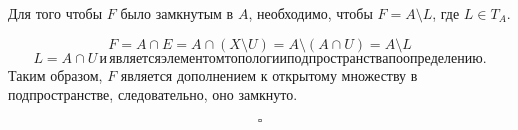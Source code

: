 \documentclass{article}
\begin{document}
        Для того чтобы \( F \) было замкнутым в \( A \), необходимо, чтобы \( F = A \setminus L \), где \( L \in T_A \).
        
        \[
        F = A \cap E = A \cap (X \setminus U) = A \setminus (A \cap U) = A \setminus L
        \]
        \[
        L = A \cap U \, \text{и} \, является элементом топологии подпространства по определению.
        \]
        Таким образом, \( F \) является дополнением к открытому множеству в подпространстве, следовательно, оно замкнуто.
        
        \[
        \square
        \]

        
               
        
\end{document}
